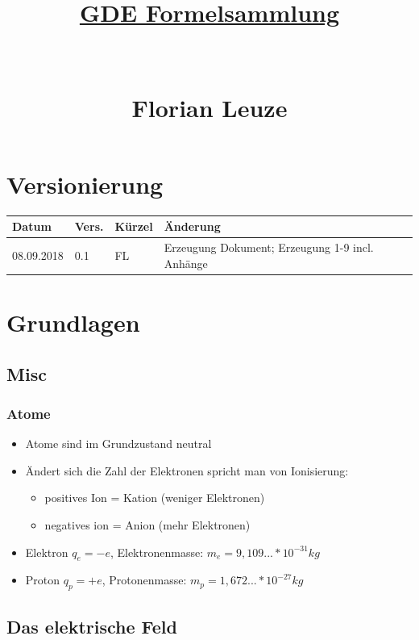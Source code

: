 \documentclass[12pt,a4paper]{article}%
\numberwithin{equation}{section}
\numberwithin{equation}{subsection}
\begin{document}


\author{}
\title{\underline{GDE Formelsammlung} \\ $\;$ \\ $\;$ \\ Florian Leuze}
\date{}

\maketitle %
\newpage
\tableofcontents

\section*{Versionierung}
  \begin{tabular}{|p{2cm}|p{1cm}|p{1.5cm}|p{8.5cm}|}\hline
    Datum & Vers. & Kürzel & Änderung \\ \hline
    08.09.2018 & 0.1 & FL & Erzeugung Dokument; Erzeugung 1-9 incl. Anhänge\\ \hline 
  \end{tabular}
  
  
\newpage
\section{Grundlagen}
  \subsection{Misc}
    \subsubsection{Atome}
\begin{itemize}
\item Atome sind im Grundzustand neutral
\item Ändert sich die Zahl der Elektronen spricht man von Ionisierung:
\begin{itemize}
\item positives Ion = Kation (weniger Elektronen)
\item negatives ion = Anion (mehr Elektronen)
\end{itemize}
\item Elektron $q_e = -e$, Elektronenmasse: $m_e = 9,109... * 10^{-31}kg$ 
\item Proton $q_p = +e$, Protonenmasse: $m_p = 1,672... * 10^{-27}kg$
\end{itemize}

\subsection{Das elektrische Feld} \label{ss:elFeld}
\end{document}

